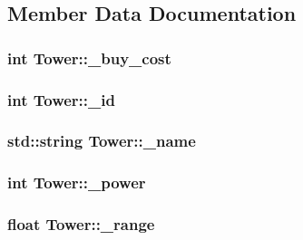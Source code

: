 \subsection{Member Data Documentation}
\hypertarget{class_tower_a102680a58c45f98a79609ce8961a7bed}{
\subsubsection[{\+\_\+buy\+\_\+cost}]{\setlength{\rightskip}{0pt plus 5cm}int Tower\+::\+\_\+buy\+\_\+cost\hspace{0.3cm}{\ttfamily [protected]}}}\label{class_tower_a102680a58c45f98a79609ce8961a7bed}
\hypertarget{class_tower_a02ec2f8d1c4dea2f7fc002d8626c8b28}{
\subsubsection[{\+\_\+id}]{\setlength{\rightskip}{0pt plus 5cm}int Tower\+::\+\_\+id\hspace{0.3cm}{\ttfamily [protected]}}}\label{class_tower_a02ec2f8d1c4dea2f7fc002d8626c8b28}
\hypertarget{class_tower_ac29247d1ed8c97c105f5f1e05fb1f92c}{
\subsubsection[{\+\_\+name}]{\setlength{\rightskip}{0pt plus 5cm}std\+::string Tower\+::\+\_\+name\hspace{0.3cm}{\ttfamily [protected]}}}\label{class_tower_ac29247d1ed8c97c105f5f1e05fb1f92c}
\hypertarget{class_tower_af9e223c165f5632944868df3dfc70bee}{
\subsubsection[{\+\_\+power}]{\setlength{\rightskip}{0pt plus 5cm}int Tower\+::\+\_\+power\hspace{0.3cm}{\ttfamily [protected]}}}\label{class_tower_af9e223c165f5632944868df3dfc70bee}
\hypertarget{class_tower_a77cd5002dac75320f83fb540a3878936}{
\subsubsection[{\+\_\+range}]{\setlength{\rightskip}{0pt plus 5cm}float Tower\+::\+\_\+range\hspace{0.3cm}{\ttfamily [protected]}}}\label{class_tower_a77cd5002dac75320f83fb540a3878936}
